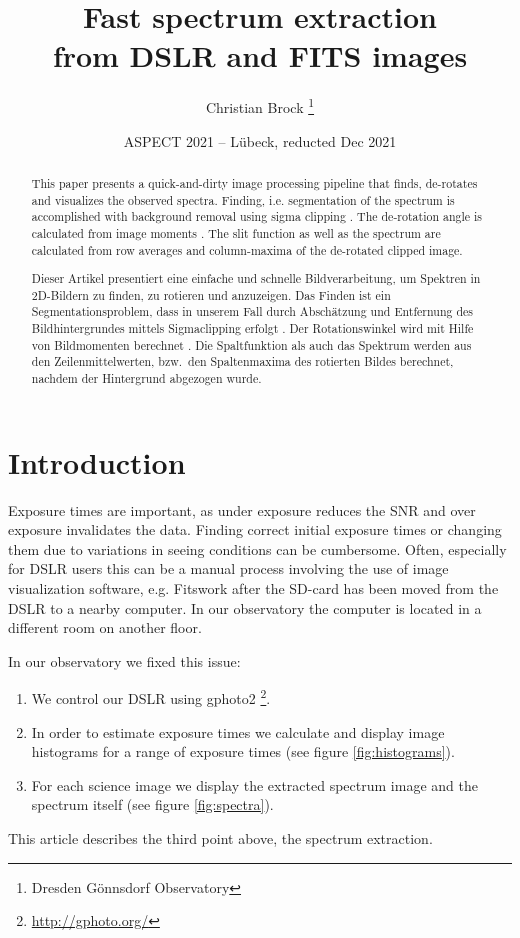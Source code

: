 \documentclass[10pt,a4paper,notitlepage]{article}
\title{Fast spectrum extraction \\
	{\small from DSLR and FITS images}}
\author{Christian Brock \footnote{Dresden Gönnsdorf Observatory}}
\date{ASPECT 2021 -- Lübeck, reducted Dec 2021}
\begin{document}
\setlength{\parindent}{0pt} 
\setlength{\parskip}{4pt} 

\maketitle

\tableofcontents

\begin{abstract}
	This paper presents a quick-and-dirty image processing pipeline that finds, de-rotates and visualizes the observed spectra.
	Finding, i.e. segmentation of the spectrum is accomplished with background removal using sigma clipping \cite{SigmaClipping}.
	The de-rotation angle is calculated from image moments \cite{ImageMoments}.
	The slit function as well as the spectrum are calculated from row averages and column-maxima of the de-rotated clipped image.
	
	\vspace{8pt}
	
	Dieser Artikel presentiert eine einfache und schnelle Bildverarbeitung, um Spektren in 2D-Bildern zu finden, zu rotieren und anzuzeigen.
	Das Finden ist ein Segmentationsproblem, dass in unserem Fall durch Abschätzung und Entfernung des Bildhintergrundes mittels Sigmaclipping erfolgt \cite{SigmaClipping}.
	Der Rotationswinkel wird mit Hilfe von Bildmomenten berechnet \cite{ImageMoments}.
	Die Spaltfunktion als auch das Spektrum werden aus den Zeilenmittelwerten, bzw.\ den Spaltenmaxima des rotierten Bildes berechnet, nachdem der Hintergrund abgezogen wurde.
\end{abstract}

\section{Introduction}
	Exposure times are important, as under exposure reduces the SNR and over exposure invalidates the data.
	Finding correct initial exposure times or changing them due to variations in seeing conditions can be cumbersome.
	Often, especially for DSLR users this can be a manual process involving the use of image visualization software, e.g. Fitswork after the SD-card has been moved from the DSLR to a nearby computer. In our observatory the computer is located in a different room on another floor.
	
	In our observatory we fixed this issue:
	\begin{enumerate}
		\item We control our DSLR using gphoto2 \footnote{\url{http://gphoto.org/}}.
		\item In order to estimate exposure times we calculate and display image histograms for a range of exposure times (see figure \ref{fig:histograms}).
		\item For each science image we display the extracted spectrum image and the spectrum itself (see figure \ref{fig:spectra}).
	\end{enumerate}
	This article describes the third point above, the spectrum extraction.
\end{document}
